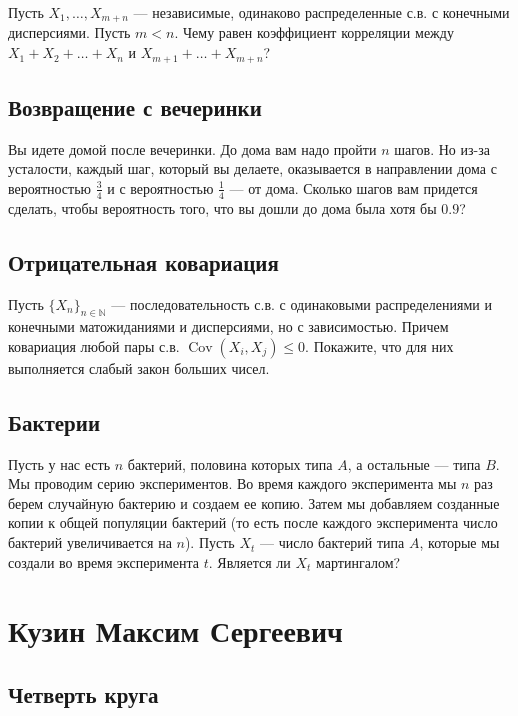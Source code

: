 \documentclass[12pt]{article}
\newcommand\N{\mathbb{N}}
\DeclareMathOperator{\Cov}{Cov}
\begin{document}
Пусть $X_1, \dots, X_{m + n}$ --- независимые, одинаково распределенные с.в. с конечными дисперсиями. Пусть $m < n$. Чему равен коэффициент корреляции между $X_1 + X_2 + \dots + X_n$ и $X_{m + 1} + \dots + X_{m + n}$?

\subsection{Возвращение с вечеринки}

Вы идете домой после вечеринки. До дома вам надо пройти $n$ шагов. Но из-за усталости, каждый шаг, который вы делаете, оказывается в направлении дома с вероятностью $\frac{3}{4}$ и с вероятностью $\frac{1}{4}$ --- от дома. Сколько шагов вам придется сделать, чтобы вероятность того, что вы дошли до дома была хотя бы $0.9$?

\subsection{Отрицательная ковариация}

Пусть $\{X_n\}_{n \in \N}$ --- последовательность с.в. с одинаковыми распределениями и конечными матожиданиями и дисперсиями, но с зависимостью. Причем ковариация любой пары с.в. $\Cov(X_i, X_j) \le 0$. Покажите, что для них выполняется слабый закон больших чисел.


\subsection{Бактерии}

Пусть у нас есть $n$ бактерий, половина которых типа $A$, а остальные --- типа $B$. Мы проводим серию экспериментов. Во время каждого эксперимента мы $n$ раз берем случайную бактерию и создаем ее копию. Затем мы добавляем созданные копии к общей популяции бактерий (то есть после каждого эксперимента число бактерий увеличивается на $n$). Пусть $X_t$ --- число бактерий типа $A$, которые мы создали во время эксперимента $t$. Является ли $X_t$ мартингалом?


\newpage
\section{Кузин Максим Сергеевич}

\subsection{Четверть круга}
\end{document}
